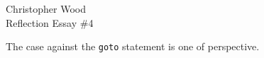 \documentclass[12pt,letterpaper]{article}
\begin{document}
\begin{center}
Christopher Wood \\
Reflection Essay \#4 \\
\end{center}

\begin{comment}
What are the most compelling arguments for the goto statement?

What are the most compelling arguments against the goto statement?

These papers were written approximately 40 years ago. Are there new arguments for or against the goto statement that are relevant 
today?

Can you give a feature or application of a programming language that you consider harmful? Be sure to back up your claim with a reasoned argument.
\end{comment}


The case against the {\tt goto} statement is one of perspective.



\end{document}
